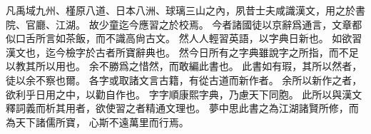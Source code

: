 凡禹域九州、槿原八道、日本八洲、球璃三山之內，夙昔士夫咸識漢文，用之於書院、官廳、江湖。
故少童迄今應習之於校焉。
今者諸國徒以京辭爲通言，文章都似口舌所言如茶飯，而不識高尙古文。
然人人輕習英語，以字典日新也。
如欲習漢文也，迄今檢字於古者所寶辭典也。
然今日所有之字典雖說字之所指，而不足以教其所以用也。
余不勝爲之惜然，而敢編此書也。
此書如有瑕，其所以然者，徒以余不察也爾。
各字或取諸文言古籍，有從古道而新作者。
余所以新作之者，欲利乎日用之中，以勸自作也。
字字順康熙字典，乃慮天下同胞。
此所以與漢文釋詞義而析其用者，欲使習之者精通文理也。
夢中思此書之為江湖諸賢所修，而為天下諸儒所寶，
心斯不遠萬里而行焉。
